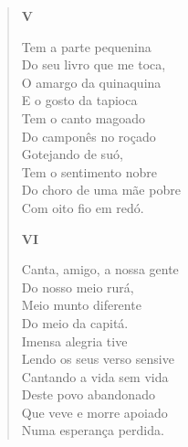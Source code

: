\begin{verse}
\textbf{V}

Tem a parte pequenina\\
Do seu livro que me toca,\\
O amargo da quinaquina\\
E o gosto da tapioca\\
Tem o canto magoado\\
Do camponês no roçado\\
Gotejando de suó,\\
Tem o sentimento nobre\\
Do choro de uma mãe pobre\\
Com oito fio em redó.

\textbf{VI}

Canta, amigo, a nossa gente\\
Do nosso meio rurá,\\
Meio munto diferente\\
Do meio da capitá.\\
Imensa alegria tive\\
Lendo os seus verso sensive\\
Cantando a vida sem vida\\
Deste povo abandonado\\
Que veve e morre apoiado\\
Numa esperança perdida.
\end{verse}

